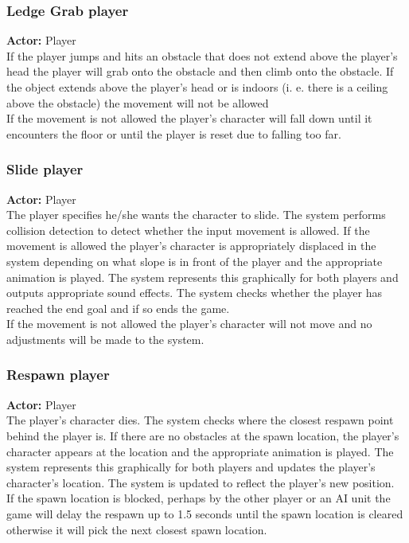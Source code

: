 \documentclass[11pt,a4paper]{article}
\begin{document}
\subsubsection{Ledge Grab player}
\textbf{Actor:} Player\smallskip\\
If the player jumps and hits an obstacle that does not extend above the player's head the player will grab onto the obstacle and then climb onto the obstacle. If the object extends above the player's head or is indoors (i. e. there is a ceiling above the obstacle) the movement will not be allowed\smallskip\\
If the movement is not allowed the player's character will fall down until it encounters the floor or until the player is reset due to falling too far.

\subsubsection{Slide player}
\textbf{Actor:} Player\smallskip\\
The player specifies he/she wants the character to slide. The system performs collision detection to detect whether the input movement is allowed. If the movement is allowed the player's character is appropriately displaced in the system depending on what slope is in front of the player and the appropriate animation is played. The system represents this graphically for both players and outputs appropriate sound effects. The system checks whether the player has reached the end goal and if so ends the game.\smallskip\\
If the movement is not allowed the player's character will not move and no adjustments will be made to the system.

\subsubsection{Respawn player}
\textbf{Actor:} Player\smallskip\\
The player's character dies. The system checks where the closest respawn point behind the player is. If there are no obstacles at the spawn location, the player's character appears at the location and the appropriate animation is played. The system represents this graphically for both players and updates the player's character's location.  The system is updated to reflect the player's new position.\smallskip\\
If the spawn location is blocked, perhaps by the other player or an AI unit the game will delay the respawn up to 1.5 seconds until the spawn location is cleared otherwise it will pick the next closest spawn location.
\end{document}
